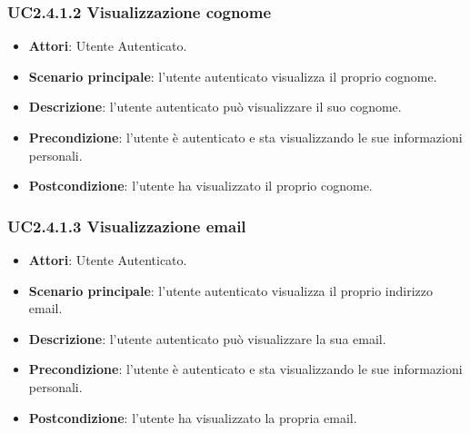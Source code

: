 \subsubsection{UC2.4.1.2 Visualizzazione cognome}
\begin{itemize}
\item \textbf{Attori}: Utente Autenticato.
\item \textbf{Scenario principale}: l'utente autenticato visualizza il proprio cognome.
\item \textbf{Descrizione}: l'utente autenticato può visualizzare il suo cognome.
\item \textbf{Precondizione}: l'utente è autenticato e sta visualizzando le sue informazioni personali.
\item \textbf{Postcondizione}: l'utente ha visualizzato il proprio cognome.
\end{itemize}
\subsubsection{UC2.4.1.3 Visualizzazione email}
\begin{itemize}
\item \textbf{Attori}: Utente Autenticato.
\item \textbf{Scenario principale}: l'utente autenticato visualizza il proprio indirizzo email.
\item \textbf{Descrizione}: l'utente autenticato può visualizzare la sua email.
\item \textbf{Precondizione}: l'utente è autenticato e sta visualizzando le sue informazioni personali.
\item \textbf{Postcondizione}: l'utente ha visualizzato la propria email.
\end{itemize}
